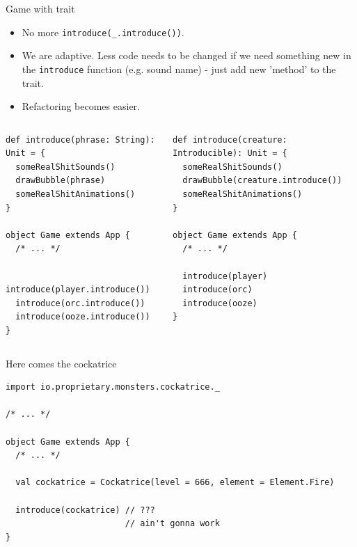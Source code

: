 \documentclass[presentation,aspectratio=169,smaller]{beamer}
\begin{document}
\begin{frame}[label={sec:org0d596a5},fragile]{Game with trait}
 \begin{itemize}
\item No more \texttt{introduce(\_.introduce())}.
\item We are adaptive. Less code needs to be changed if we need something new in the
\texttt{introduce} function (e.g. sound name) - just add new 'method' to the trait.
\item Refactoring becomes easier.
\end{itemize}

\begin{columns}
\begin{column}[t]{0.5\columnwidth}
\begin{verbatim}
def introduce(phrase: String): Unit = {
  someRealShitSounds()
  drawBubble(phrase)
  someRealShitAnimations()
}

object Game extends App {
  /* ... */

  introduce(player.introduce())
  introduce(orc.introduce())
  introduce(ooze.introduce())
}
\end{verbatim}
\end{column}

\begin{column}[t]{0.5\columnwidth}
\begin{verbatim}
def introduce(creature: Introducible): Unit = {
  someRealShitSounds()
  drawBubble(creature.introduce())
  someRealShitAnimations()
}

object Game extends App {
  /* ... */

  introduce(player)
  introduce(orc)
  introduce(ooze)
}
\end{verbatim}
\end{column}
\end{columns}
\end{frame}

\begin{frame}[label={sec:org9ee476a},fragile]{Here comes the cockatrice}
 \begin{verbatim}
import io.proprietary.monsters.cockatrice._

/* ... */

object Game extends App {
  /* ... */

  val cockatrice = Cockatrice(level = 666, element = Element.Fire)

  introduce(cockatrice) // ???
                        // ain't gonna work
}
\end{verbatim}
\end{frame}
\end{document}
